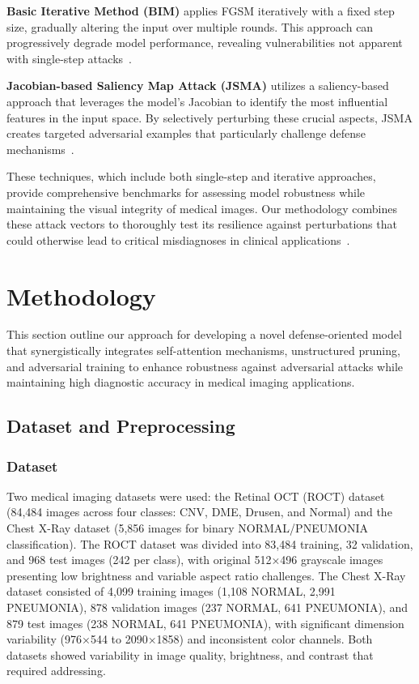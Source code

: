 \documentclass[preprint,12pt]{elsarticle}
\begin{document}
\textbf{Basic Iterative Method (BIM)} applies FGSM iteratively with a fixed step size, gradually altering the input over multiple rounds. This approach can progressively degrade model performance, revealing vulnerabilities not apparent with single-step attacks~\cite{Li22}.

\textbf{Jacobian-based Saliency Map Attack (JSMA)} utilizes a saliency-based approach that leverages the model's Jacobian to identify the most influential features in the input space. By selectively perturbing these crucial aspects, JSMA creates targeted adversarial examples that particularly challenge defense mechanisms~\cite{Yu24}.

These techniques, which include both single-step and iterative approaches, provide comprehensive benchmarks for assessing model robustness while maintaining the visual integrity of medical images. Our methodology combines these attack vectors to thoroughly test its resilience against perturbations that could otherwise lead to critical misdiagnoses in clinical applications~\cite{Wang22, Esmaeili23}.

\section{Methodology}
\label{sec:methodology}

This section outline our approach for developing a novel defense-oriented model that synergistically integrates self-attention mechanisms, unstructured pruning, and adversarial training to enhance robustness against adversarial attacks while maintaining high diagnostic accuracy in medical imaging applications.

\subsection{Dataset and Preprocessing}

\subsubsection{Dataset}
Two medical imaging datasets were used: the Retinal OCT (ROCT) dataset (84,484 images across four classes: CNV, DME, Drusen, and Normal) and the Chest X-Ray dataset (5,856 images for binary NORMAL/PNEUMONIA classification). The ROCT dataset was divided into 83,484 training, 32 validation, and 968 test images (242 per class), with original 512×496 grayscale images presenting low brightness and variable aspect ratio challenges. The Chest X-Ray dataset consisted of 4,099 training images (1,108 NORMAL, 2,991 PNEUMONIA), 878 validation images (237 NORMAL, 641 PNEUMONIA), and 879 test images (238 NORMAL, 641 PNEUMONIA), with significant dimension variability (976×544 to 2090×1858) and inconsistent color channels. Both datasets showed variability in image quality, brightness, and contrast that required addressing.
\end{document}
